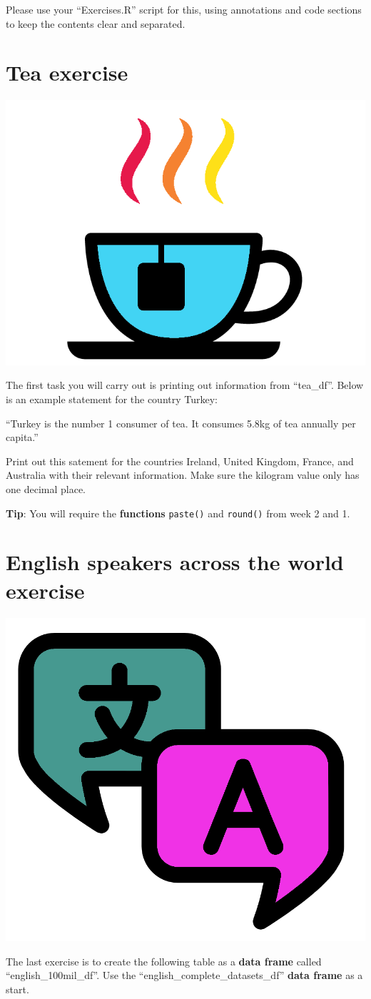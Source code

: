 \documentclass[]{book}
\begin{document}
Please use your ``Exercises.R'' script for this, using annotations and
code sections to keep the contents clear and separated.

\section{Tea exercise}\label{tea-exercise}

\begin{center}\includegraphics[width=0.2\linewidth]{figures/tea} \end{center}

The first task you will carry out is printing out information from
``tea\_df''. Below is an example statement for the country Turkey:

``Turkey is the number 1 consumer of tea. It consumes 5.8kg of tea
annually per capita.''

Print out this satement for the countries Ireland, United Kingdom,
France, and Australia with their relevant information. Make sure the
kilogram value only has one decimal place.

\textbf{Tip}: You will require the \textbf{functions} \texttt{paste()}
and \texttt{round()} from week 2 and 1.

\section{English speakers across the world
exercise}\label{english-speakers-across-the-world-exercise}

\begin{center}\includegraphics[width=0.2\linewidth]{figures/language} \end{center}

The last exercise is to create the following table as a \textbf{data
frame} called ``english\_100mil\_df''. Use the
``english\_complete\_datasets\_df'' \textbf{data frame} as a start.
\end{document}
